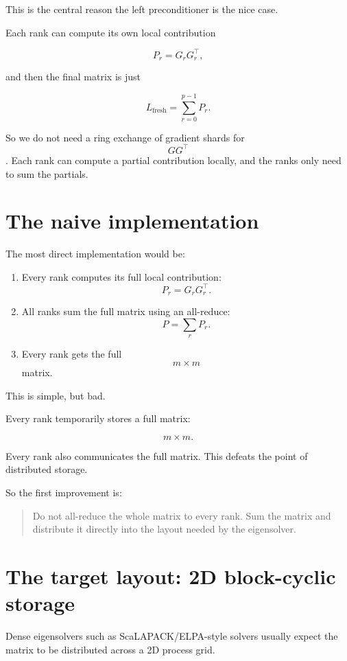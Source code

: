 \documentclass[11pt]{article}
\begin{document}
This is the central reason the left preconditioner is the nice case.

Each rank can compute its own local contribution

$$
P_r = G_rG_r^\top,
$$

and then the final matrix is just

$$
L_{\text{fresh}}
=
\sum_{r=0}^{p-1} P_r.
$$

So we do not need a ring exchange of gradient shards for $$GG^\top$$. Each rank can compute a partial contribution locally, and the ranks only need to sum the partials.

\section{The naive implementation}

The most direct implementation would be:

\begin{enumerate}
    \item Every rank computes its full local contribution:
    $$
    P_r = G_rG_r^\top.
    $$

    \item All ranks sum the full matrix using an all-reduce:
    $$
    P = \sum_r P_r.
    $$

    \item Every rank gets the full $$m \times m$$ matrix.
\end{enumerate}

This is simple, but bad.

Every rank temporarily stores a full matrix:

$$
m \times m.
$$

Every rank also communicates the full matrix. This defeats the point of distributed storage.

So the first improvement is:

\begin{quote}
Do not all-reduce the whole matrix to every rank. Sum the matrix and distribute it directly into the layout needed by the eigensolver.
\end{quote}

\section{The target layout: 2D block-cyclic storage}

Dense eigensolvers such as ScaLAPACK/ELPA-style solvers usually expect the matrix to be distributed across a 2D process grid.
\end{document}
